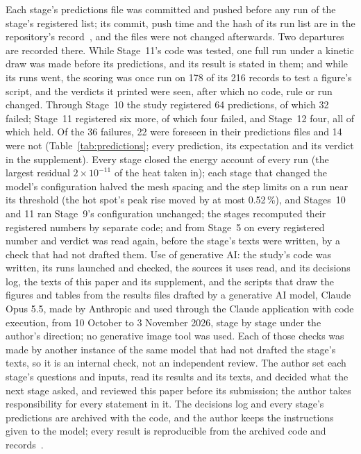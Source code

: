 \documentclass[preprint,12pt]{elsarticle}
\begin{document}
Each stage's predictions file was committed and pushed before any run of the stage's registered list; its commit, push time and the hash of its run list are in the repository's record~\cite{satte2026repo}, and the files were not changed afterwards. Two departures are recorded there. While Stage~11's code was tested, one full run under a kinetic draw was made before its predictions, and its result is stated in them; and while its runs went, the scoring was once run on 178 of its 216 records to test a figure's script, and the verdicts it printed were seen, after which no code, rule or run changed. Through Stage~10 the study registered 64 predictions, of which 32 failed; Stage~11 registered six more, of which four failed, and Stage~12 four, all of which held. Of the 36 failures, 22 were foreseen in their predictions files and 14 were not (Table~\ref{tab:predictions}; every prediction, its expectation and its verdict in the supplement). Every stage closed the energy account of every run (the largest residual $2\times10^{-11}$ of the heat taken in); each stage that changed the model's configuration halved the mesh spacing and the step limits on a run near its threshold (the hot spot's peak rise moved by at most 0.52\,\%), and Stages~10 and 11 ran Stage~9's configuration unchanged; the stages recomputed their registered numbers by separate code; and from Stage~5 on every registered number and verdict was read again, before the stage's texts were written, by a check that had not drafted them. Use of generative AI: the study's code was written, its runs launched and checked, the sources it uses read, and its decisions log, the texts of this paper and its supplement, and the scripts that draw the figures and tables from the results files drafted by a generative AI model, Claude Opus 5.5, made by Anthropic and used through the Claude application with code execution, from 10 October to 3 November 2026, stage by stage under the author's direction; no generative image tool was used. Each of those checks was made by another instance of the same model that had not drafted the stage's texts, so it is an internal check, not an independent review. The author set each stage's questions and inputs, read its results and its texts, and decided what the next stage asked, and reviewed this paper before its submission; the author takes responsibility for every statement in it. The decisions log and every stage's predictions are archived with the code, and the author keeps the instructions given to the model; every result is reproducible from the archived code and records~\cite{satte2026repo}.
\end{document}
